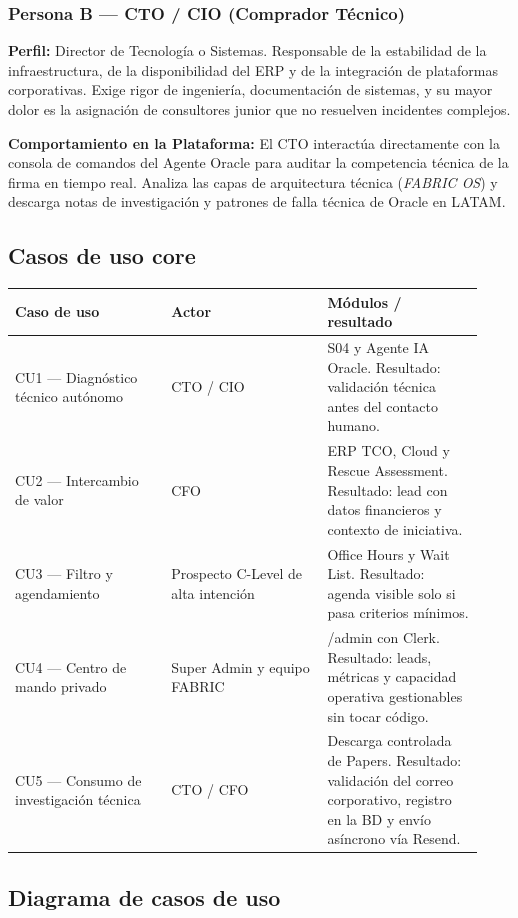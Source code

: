 \documentclass[11pt,letterpaper]{article}
\begin{document}
\subsubsection{Persona B — CTO / CIO (Comprador Técnico)}
\textbf{Perfil:} Director de Tecnología o Sistemas. Responsable de la estabilidad de la infraestructura, de la disponibilidad del ERP y de la integración de plataformas corporativas. Exige rigor de ingeniería, documentación de sistemas, y su mayor dolor es la asignación de consultores junior que no resuelven incidentes complejos.

\textbf{Comportamiento en la Plataforma:} El CTO interactúa directamente con la consola de comandos del Agente Oracle para auditar la competencia técnica de la firma en tiempo real. Analiza las capas de arquitectura técnica (\emph{FABRIC OS}) y descarga notas de investigación y patrones de falla técnica de Oracle en LATAM.

\subsection{Casos de uso core}

\begin{longtable}{p{0.31\linewidth}p{0.31\linewidth}p{0.31\linewidth}}
\toprule
\textbf{Caso de uso} & \textbf{Actor} & \textbf{Módulos / resultado} \\
\midrule
CU1 — Diagnóstico técnico autónomo & CTO / CIO & S04 y Agente IA Oracle. Resultado: validación técnica antes del contacto humano. \\
CU2 — Intercambio de valor & CFO & ERP TCO, Cloud y Rescue Assessment. Resultado: lead con datos financieros y contexto de iniciativa. \\
CU3 — Filtro y agendamiento & Prospecto C-Level de alta intención & Office Hours y Wait List. Resultado: agenda visible solo si pasa criterios mínimos. \\
CU4 — Centro de mando privado & Super Admin y equipo FABRIC & /admin con Clerk. Resultado: leads, métricas y capacidad operativa gestionables sin tocar código. \\
CU5 — Consumo de investigación técnica & CTO / CFO & Descarga controlada de Papers. Resultado: validación del correo corporativo, registro en la BD y envío asíncrono vía Resend. \\
\bottomrule
\end{longtable}

\subsection{Diagrama de casos de uso}
\end{document}
